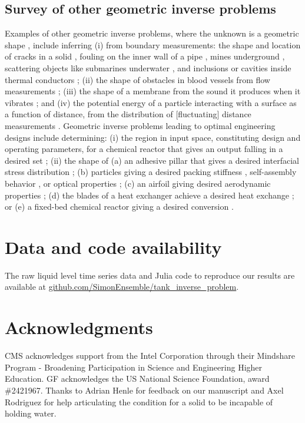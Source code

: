 \documentclass[a4paper,fleqn]{cas-dc}
\begin{document}
\subsection{Survey of other geometric inverse problems}
Examples of other geometric inverse problems, where the unknown is a geometric shape \cite{ameur2004level,burger2001level,harbrecht2013numerical,kawakami2020stabilities}, include inferring
(i) from boundary measurements: the shape and location of cracks in a solid \cite{nishimura1991boundary}, fouling on the inner wall of a pipe \cite{chen2011inverse}, mines underground \cite{delbary2007inverse,lopez2003detection}, scattering objects like submarines \cite{yaman2013survey} underwater \cite{buchanan2004marine}, and inclusions or cavities inside thermal conductors \cite{wang2018numerical,nakamura2015reconstruction};
(ii) the shape of obstacles in blood vessels from flow measurements \cite{aguayo2021distributed,nolte2022inverse}; 
(iii) the shape of a membrane from the sound it produces when it vibrates \cite{kac1966can}; 
and 
(iv) the potential energy of a particle interacting with a surface as a function of distance, from the distribution of [fluctuating] distance measurements \cite{prieve1999measurement}.
Geometric inverse problems leading to optimal engineering designs include determining: 
(i) the region in input space, constituting design and operating parameters, for a chemical reactor that gives an output falling in a desired set \cite{alves2023inverse,gazzaneo2019process}; 
(ii) the shape of (a) an adhesive pillar that gives a desired interfacial stress distribution \cite{kim2020designing};
(b) particles giving a desired packing stiffness \cite{miskin2013adapting}, self-assembly behavior \cite{sacanna2013engineering}, or optical properties \cite{forestiere2016inverse};
(c) an airfoil giving desired aerodynamic properties \cite{sun2015artificial};
(d) the blades of a heat exchanger achieve a desired heat exchange \cite{hilbert2006multi};
or
(e) a fixed-bed chemical reactor giving a desired conversion \cite{courtais2021shape}. 

\section*{Data and code availability} The raw liquid level time series data and Julia code to reproduce our results are available at \url{github.com/SimonEnsemble/tank_inverse_problem}.


\section*{Acknowledgments}
CMS acknowledges support from the Intel Corporation through their Mindshare Program - Broadening Participation in Science and Engineering Higher Education. 
GF acknowledges the US National Science Foundation, award \#2421967. 
Thanks to 
Adrian Henle for feedback on our manuscript and Axel Rodriguez for help articulating the condition for a solid to be incapable of holding water.
\end{document}
